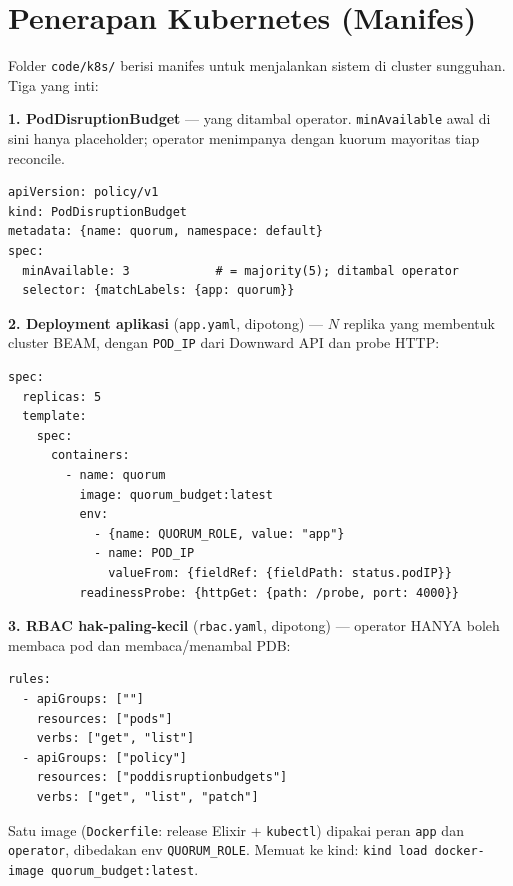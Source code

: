 \documentclass[11pt]{article}
\newcommand{\code}[1]{\texttt{\small #1}}
\begin{document}
\section{Penerapan Kubernetes (Manifes)}
\label{sec:k8s}
Folder \code{code/k8s/} berisi manifes untuk menjalankan sistem di cluster sungguhan. Tiga yang inti:

\textbf{1. PodDisruptionBudget} --- yang ditambal operator. \code{minAvailable} awal di sini hanya
placeholder; operator menimpanya dengan kuorum mayoritas tiap reconcile.
\begin{lstlisting}[style=yml]
apiVersion: policy/v1
kind: PodDisruptionBudget
metadata: {name: quorum, namespace: default}
spec:
  minAvailable: 3            # = majority(5); ditambal operator
  selector: {matchLabels: {app: quorum}}
\end{lstlisting}

\textbf{2. Deployment aplikasi} (\code{app.yaml}, dipotong) --- $N$ replika yang membentuk cluster BEAM,
dengan \code{POD\_IP} dari Downward API dan probe HTTP:
\begin{lstlisting}[style=yml]
spec:
  replicas: 5
  template:
    spec:
      containers:
        - name: quorum
          image: quorum_budget:latest
          env:
            - {name: QUORUM_ROLE, value: "app"}
            - name: POD_IP
              valueFrom: {fieldRef: {fieldPath: status.podIP}}
          readinessProbe: {httpGet: {path: /probe, port: 4000}}
\end{lstlisting}

\textbf{3. RBAC hak-paling-kecil} (\code{rbac.yaml}, dipotong) --- operator HANYA boleh membaca pod dan
membaca/menambal PDB:
\begin{lstlisting}[style=yml]
rules:
  - apiGroups: [""]
    resources: ["pods"]
    verbs: ["get", "list"]
  - apiGroups: ["policy"]
    resources: ["poddisruptionbudgets"]
    verbs: ["get", "list", "patch"]
\end{lstlisting}
Satu image (\code{Dockerfile}: release Elixir + \code{kubectl}) dipakai peran \code{app} dan
\code{operator}, dibedakan env \code{QUORUM\_ROLE}. Memuat ke kind: \code{kind load docker-image
quorum\_budget:latest}.

\end{document}
